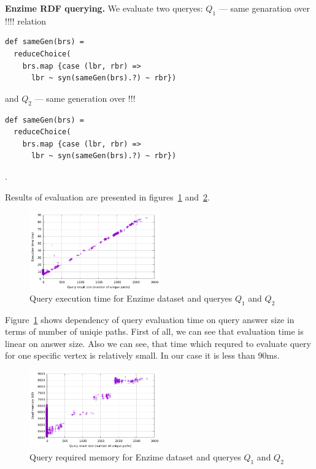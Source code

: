 \textbf{Enzime RDF querying.} We evaluate two queryes: $Q_1$ --- same genaration over !!!! relation
\begin{lstlisting}
def sameGen(brs) =
  reduceChoice(
    brs.map {case (lbr, rbr) =>
      lbr ~ syn(sameGen(brs).?) ~ rbr})
\end{lstlisting}

and $Q_2$ --- same generation over !!!
\begin{lstlisting}
def sameGen(brs) =
  reduceChoice(
    brs.map {case (lbr, rbr) =>
      lbr ~ syn(sameGen(brs).?) ~ rbr})
\end{lstlisting}
.

Results of evaluation are presented in figures~\ref{fig:enzime_time_per_paths} and~\ref{fig:enzime_mem_per_paths}.


\begin{figure}[ht]
  \begin{center}
    \includegraphics[width=0.5\textwidth]{data/enzime_narrowerTr_time_per_paths.pdf}
    \caption{Query execution time for Enzime dataset and queryes $Q_1$ and $Q_2$}
    \label{fig:enzime_time_per_paths}
  \end{center}
\end{figure}

Figure~\ref{fig:enzime_time_per_paths} shows dependency of query evaluation time on query answer size in terms of number of uniqie paths.
First of all, we can see that evaluation time is linear on answer size.
Also we can see, that time which requred to evaluate query for one specific vertex is relatively small.
In our case it is less than 90ms.

\begin{figure}[ht]
  \begin{center}
    \includegraphics[width=0.5\textwidth]{data/enzime_narrowerTr_mem_per_paths.pdf}
    \caption{Query required memory for Enzime dataset and queryes $Q_1$ and $Q_2$}
    \label{fig:enzime_mem_per_paths}
  \end{center}
\end{figure}

